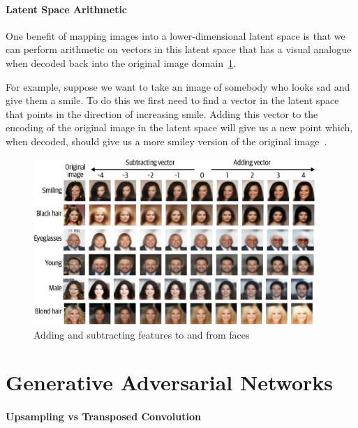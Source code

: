 \paragraph{Latent Space Arithmetic}


One benefit of mapping images into a lower-dimensional latent space is that we can perform arithmetic on vectors in this latent space that has a visual analogue when decoded back into the original image domain~\cref{fig:vae_latent_space_arithmetic}.

For example, suppose we want to take an image of somebody who looks sad and give them a smile.
To do this we first need to find a vector in the latent space that points in the direction of increasing smile.
Adding this vector to the encoding of the original image in the latent space will give us a new point which, when decoded, should give us a more smiley version of the original image~\cite{foster2022generative}.


\begin{figure}
	\begin{center}
		\includegraphics[width=0.95\textwidth]{figures/vae_latent_space_arithmetic}
	\end{center}
	\caption{Adding and subtracting features to and from faces}\label{fig:vae_latent_space_arithmetic}
\end{figure}


\section{Generative Adversarial Networks}

\paragraph{Upsampling vs Transposed Convolution}

